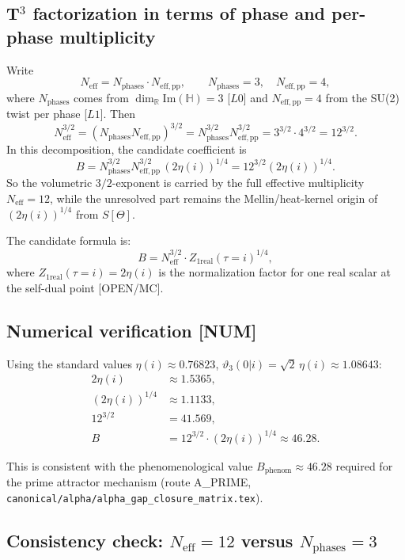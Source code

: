 \documentclass[12pt,a4paper]{article}
\begin{document}
\subsection*{T\(^3\) factorization in terms of phase and per-phase multiplicity}
Write
\[
N_{\mathrm{eff}} = N_{\mathrm{phases}}\cdot N_{\mathrm{eff,pp}},
\qquad
N_{\mathrm{phases}}=3,\quad N_{\mathrm{eff,pp}}=4,
\]
where \(N_{\mathrm{phases}}\) comes from \(\dim_{\mathbb R}\mathrm{Im}(\mathbb H)=3\)
[\(L0\)] and \(N_{\mathrm{eff,pp}}=4\) from the SU(2) twist per phase [\(L1\)].
Then
\[
N_{\mathrm{eff}}^{3/2}
=\left(N_{\mathrm{phases}}N_{\mathrm{eff,pp}}\right)^{3/2}
=N_{\mathrm{phases}}^{3/2}N_{\mathrm{eff,pp}}^{3/2}
=3^{3/2}\cdot4^{3/2}=12^{3/2}.
\]
In this decomposition, the candidate coefficient is
\[
B
=N_{\mathrm{phases}}^{3/2}N_{\mathrm{eff,pp}}^{3/2}\,(2\eta(i))^{1/4}
=12^{3/2}(2\eta(i))^{1/4}.
\]
So the volumetric \(3/2\)-exponent is carried by the full effective multiplicity
\(N_{\mathrm{eff}}=12\), while the unresolved part remains the Mellin/heat-kernel
origin of \((2\eta(i))^{1/4}\) from \(S[\Theta]\).

The candidate formula is:
\begin{equation}
B = N_{\mathrm{eff}}^{3/2}\cdot Z_{1\mathrm{real}}(\tau=i)^{1/4},
\label{eq:B_candidate}
\end{equation}
where $Z_{1\mathrm{real}}(\tau=i) = 2\eta(i)$ is the normalization factor for
one real scalar at the self-dual point [OPEN/MC].

\subsection*{Numerical verification [NUM]}

Using the standard values $\eta(i) \approx 0.76823$,
$\vartheta_3(0|i) = \sqrt{2}\,\eta(i) \approx 1.08643$:
\begin{align}
2\eta(i) &\approx 1.5365, \label{eq:2eta}\\
(2\eta(i))^{1/4} &\approx 1.1133, \label{eq:2eta_14}\\
12^{3/2} &= 41.569, \label{eq:neff32}\\
B &= 12^{3/2}\cdot(2\eta(i))^{1/4} \approx 46.28. \label{eq:B_num}
\end{align}

This is consistent with the phenomenological value $B_{\mathrm{phenom}}\approx 46.28$
required for the prime attractor mechanism (route A\_PRIME,
\texttt{canonical/alpha/alpha\_gap\_closure\_matrix.tex}).

\subsection*{Consistency check: $N_{\mathrm{eff}} = 12$ versus $N_{\mathrm{phases}} = 3$}
\end{document}
